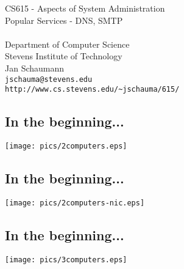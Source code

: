 \documentclass[xga]{xdvislides}
\begin{document}
\setfontphv

\lhead{\slidetitle}                               %
\cfoot{\relax}                               %
\rfoot{\Gray{\today}}

\vspace*{\fill}
\begin{center}
	\Hugesize
		CS615 - Aspects of System Administration\\ [1em]
		Popular Services - DNS, SMTP\\ [1em]
	\hspace*{5mm}\blueline\\ [1em]
	\Normalsize
		Department of Computer Science\\
		Stevens Institute of Technology\\
		Jan Schaumann\\
		\verb+jschauma@stevens.edu+ \\
		\verb+http://www.cs.stevens.edu/~jschauma/615/+
\end{center}
\vspace*{\fill}

\subsection{In the beginning...}
\vspace*{\fill}
\begin{center}
	\texttt{[image: pics/2computers.eps]} \\
\end{center}
\vspace*{\fill}

\subsection{In the beginning...}
\vspace*{\fill}
\begin{center}
	\texttt{[image: pics/2computers-nic.eps]} \\
\end{center}
\vspace*{\fill}

\subsection{In the beginning...}
\vspace*{\fill}
\begin{center}
	\texttt{[image: pics/3computers.eps]} \\
\end{center}
\vspace*{\fill}
\end{document}
